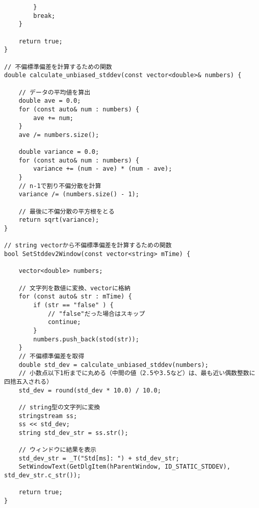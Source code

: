 \begin{verbatim}
		}
		break;
	}

	return true;
}

// 不偏標準偏差を計算するための関数
double calculate_unbiased_stddev(const vector<double>& numbers) {

	// データの平均値を算出
	double ave = 0.0;
	for (const auto& num : numbers) {
		ave += num;
	}
	ave /= numbers.size();

	double variance = 0.0;
	for (const auto& num : numbers) {
		variance += (num - ave) * (num - ave);
	}
	// n-1で割り不偏分散を計算
	variance /= (numbers.size() - 1);
	
	// 最後に不偏分散の平方根をとる
	return sqrt(variance);
}

// string vectorから不偏標準偏差を計算するための関数
bool SetStddev2Window(const vector<string> mTime) {

	vector<double> numbers;

	// 文字列を数値に変換、vectorに格納
	for (const auto& str : mTime) {
		if (str == "false" ) {
			// "false"だった場合はスキップ
			continue;
		}
		numbers.push_back(stod(str));
	}
	// 不偏標準偏差を取得
	double std_dev = calculate_unbiased_stddev(numbers);
	// 小数点以下1桁までに丸める（中間の値（2.5や3.5など）は、最も近い偶数整数に四捨五入される）
	std_dev = round(std_dev * 10.0) / 10.0;

	// string型の文字列に変換
	stringstream ss;
	ss << std_dev;
	string std_dev_str = ss.str();

	// ウィンドウに結果を表示
	std_dev_str = _T("Std[ms]: ") + std_dev_str;
	SetWindowText(GetDlgItem(hParentWindow, ID_STATIC_STDDEV), std_dev_str.c_str());

	return true;
}
\end{verbatim}